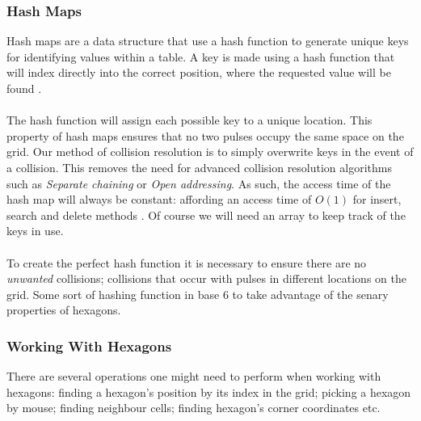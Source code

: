 \documentclass[10pt,a4paper]{article}
\begin{document}
\subsubsection{Hash Maps}
Hash maps are a data structure that use a hash function to generate unique keys for identifying values within a table. A key is made using a hash function that will index directly into the correct position, where the requested value will be found \cite{hashm}.\\
\\
The hash function will assign each possible key to a unique location. This property of hash maps ensures that no two pulses occupy the same space on the grid. Our method of collision resolution is to simply overwrite keys in the event of a collision. This removes the need for advanced collision resolution algorithms such as \textit{Separate chaining} or \textit{Open addressing}. As such, the access time of the hash map will always be constant: affording an access time of $ O(1) $ for insert, search and delete methods \cite{stein}. Of course we will need an array to keep track of the keys in use.\\
\\
To create the perfect hash function it is necessary to ensure there are no \textit{unwanted} collisions; collisions that occur with pulses in different locations on the grid. Some sort of hashing function in base 6 to take advantage of the senary properties of hexagons.\\

\subsubsection{Working With Hexagons}
There are several operations one might need to perform when working with hexagons: finding a hexagon's position by its index in the grid; picking a hexagon by mouse; finding neighbour cells; finding hexagon's corner coordinates etc.\\
\end{document}
